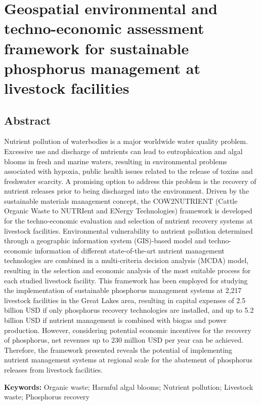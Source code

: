 \chapter{Geospatial environmental and techno-economic assessment framework for sustainable phosphorus management at livestock facilities}\label{ch:Tool}
\section*{Abstract}
Nutrient pollution of waterbodies is a major worldwide water quality problem. Excessive use and discharge of nutrients can lead to eutrophication and algal blooms in fresh and marine waters, resulting in environmental problems associated with hypoxia, public health issues related to the release of toxins and freshwater scarcity. A promising option to address this problem is the recovery of nutrient releases prior to being discharged into the environment. Driven by the sustainable materials management concept, the COW2NUTRIENT (Cattle Organic Waste to NUTRIent and ENergy Technologies) framework is developed for the techno-economic evaluation and selection of nutrient recovery systems at livestock facilities. Environmental vulnerability to nutrient pollution determined through a geographic information system (GIS)-based model and techno-economic information of different state-of-the-art nutrient management technologies are combined in a multi-criteria decision analysis (MCDA) model, resulting in the selection and economic analysis of the most suitable process for each studied livestock facility. This framework has been employed for studying the implementation of sustainable phosphorus management systems at 2,217 livestock facilities in the Great Lakes area, resulting in capital expenses of 2.5 billion USD if only phosphorus recovery technologies are installed, and up to 5.2 billion USD if nutrient management is combined with biogas and power production. However, considering potential economic incentives for the recovery of phosphorus, net revenues up to 230 million USD per year can be achieved. Therefore, the framework presented reveals the potential of implementing nutrient management systems at regional scale for the abatement of phosphorus releases from livestock facilities.

\bigskip
\textbf{Keywords:} Organic waste; Harmful algal blooms; Nutrient pollution; Livestock waste; Phosphorus recovery

